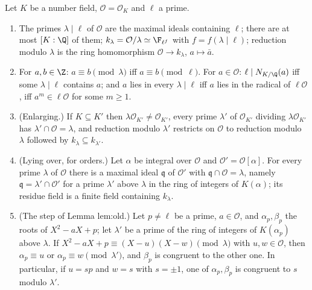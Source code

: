 \begin{proposition}\label{prop:ant:primesabove}
Let $K$ be a number field, $\mathcal O=\mathcal O_K$ and $\ell$ a prime.
\begin{enumerate}[label=(\roman*)]
\item The primes $\lambda\mid\ell$ of $\mathcal O$ are the maximal ideals containing $\ell$; there are at most $[K:\Q]$ of them; $k_\lambda=\mathcal O/\lambda\simeq\F_{\ell^f}$
with $f=f(\lambda\mid\ell)$; reduction modulo $\lambda$ is the ring homomorphism $\mathcal O\to k_\lambda$, $a\mapsto\bar a$.
\item For $a,b\in\Z$: $a\equiv b\pmod\lambda$ iff $a\equiv b\pmod\ell$. For $a\in\mathcal O$: $\ell\mid N_{K/\Q}(a)$ iff some $\lambda\mid\ell$ contains $a$; and $a$ lies in
every $\lambda\mid\ell$ iff $a$ lies in the radical of $\ell\mathcal O$, iff $a^m\in\ell\mathcal O$ for some $m\ge1$.
\item (Enlarging.) If $K\subseteq K'$ then $\lambda\mathcal O_{K'}\ne\mathcal O_{K'}$, every prime $\lambda'$ of $\mathcal O_{K'}$ dividing $\lambda\mathcal O_{K'}$ has
$\lambda'\cap\mathcal O=\lambda$, and reduction modulo $\lambda'$ restricts on $\mathcal O$ to reduction modulo $\lambda$ followed by $k_\lambda\subseteq k_{\lambda'}$.
\item (Lying over, for orders.) Let $\alpha$ be integral over $\mathcal O$ and $\mathcal O'=\mathcal O[\alpha]$. For every prime $\lambda$ of $\mathcal O$ there is a maximal
ideal $\mathfrak q$ of $\mathcal O'$ with $\mathfrak q\cap\mathcal O=\lambda$, namely $\mathfrak q=\lambda'\cap\mathcal O'$ for a prime $\lambda'$ above $\lambda$ in the ring of integers of
$K(\alpha)$; its residue field is a finite field containing $k_\lambda$.
\item (The step of Lemma lem:old.) Let $p\ne\ell$ be a prime, $a\in\mathcal O$, and $\alpha_p,\beta_p$ the roots of $X^2-aX+p$; let $\lambda'$ be a prime of the ring of
integers of $K(\alpha_p)$ above $\lambda$. If $X^2-aX+p\equiv(X-u)(X-w)\pmod\lambda$ with $u,w\in\mathcal O$, then $\alpha_p\equiv u$ or $\alpha_p\equiv w\pmod{\lambda'}$,
and $\beta_p$ is congruent to the other one. In particular, if $u=sp$ and $w=s$ with $s=\pm1$, one of $\alpha_p,\beta_p$ is congruent to $s$ modulo $\lambda'$.
\end{enumerate}
\end{proposition}

